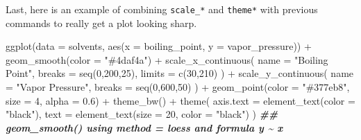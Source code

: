 \documentclass[
]{krantz}
\newenvironment{Shaded}{\begin{snugshade}}{\end{snugshade}}
\newcommand{\AttributeTok}[1]{\textcolor[rgb]{0.77,0.63,0.00}{#1}}
\newcommand{\DecValTok}[1]{\textcolor[rgb]{0.00,0.00,0.81}{#1}}
\newcommand{\DocumentationTok}[1]{\textcolor[rgb]{0.56,0.35,0.01}{\textbf{\textit{#1}}}}
\newcommand{\FloatTok}[1]{\textcolor[rgb]{0.00,0.00,0.81}{#1}}
\newcommand{\FunctionTok}[1]{\textcolor[rgb]{0.00,0.00,0.00}{#1}}
\newcommand{\NormalTok}[1]{#1}
\newcommand{\SpecialCharTok}[1]{\textcolor[rgb]{0.00,0.00,0.00}{#1}}
\newcommand{\StringTok}[1]{\textcolor[rgb]{0.31,0.60,0.02}{#1}}
\begin{document}
Last, here is an example of combining \texttt{scale\_*} and \texttt{theme*} with previous commands to really get a plot looking sharp.

\begin{Shaded}
\begin{Highlighting}[]
\FunctionTok{ggplot}\NormalTok{(}\AttributeTok{data =}\NormalTok{ solvents, }\FunctionTok{aes}\NormalTok{(}\AttributeTok{x =}\NormalTok{ boiling\_point, }\AttributeTok{y =}\NormalTok{ vapor\_pressure)) }\SpecialCharTok{+} 
  \FunctionTok{geom\_smooth}\NormalTok{(}\AttributeTok{color =} \StringTok{"\#4daf4a"}\NormalTok{) }\SpecialCharTok{+}
  \FunctionTok{scale\_x\_continuous}\NormalTok{(}
    \AttributeTok{name =} \StringTok{"Boiling Point"}\NormalTok{, }\AttributeTok{breaks =} \FunctionTok{seq}\NormalTok{(}\DecValTok{0}\NormalTok{,}\DecValTok{200}\NormalTok{,}\DecValTok{25}\NormalTok{), }\AttributeTok{limits =} \FunctionTok{c}\NormalTok{(}\DecValTok{30}\NormalTok{,}\DecValTok{210}\NormalTok{)}
\NormalTok{  ) }\SpecialCharTok{+}
  \FunctionTok{scale\_y\_continuous}\NormalTok{(}
    \AttributeTok{name =} \StringTok{"Vapor Pressure"}\NormalTok{, }\AttributeTok{breaks =} \FunctionTok{seq}\NormalTok{(}\DecValTok{0}\NormalTok{,}\DecValTok{600}\NormalTok{,}\DecValTok{50}\NormalTok{)}
\NormalTok{  ) }\SpecialCharTok{+}
  \FunctionTok{geom\_point}\NormalTok{(}\AttributeTok{color =} \StringTok{"\#377eb8"}\NormalTok{, }\AttributeTok{size =} \DecValTok{4}\NormalTok{, }\AttributeTok{alpha =} \FloatTok{0.6}\NormalTok{) }\SpecialCharTok{+}
  \FunctionTok{theme\_bw}\NormalTok{() }\SpecialCharTok{+}
  \FunctionTok{theme}\NormalTok{(}
    \AttributeTok{axis.text =} \FunctionTok{element\_text}\NormalTok{(}\AttributeTok{color =} \StringTok{"black"}\NormalTok{),}
    \AttributeTok{text =} \FunctionTok{element\_text}\NormalTok{(}\AttributeTok{size =} \DecValTok{20}\NormalTok{, }\AttributeTok{color =} \StringTok{"black"}\NormalTok{)}
\NormalTok{  )}
\DocumentationTok{\#\# \textasciigrave{}geom\_smooth()\textasciigrave{} using method = \textquotesingle{}loess\textquotesingle{} and formula \textquotesingle{}y \textasciitilde{} x\textquotesingle{}}
\end{Highlighting}
\end{Shaded}
\end{document}
